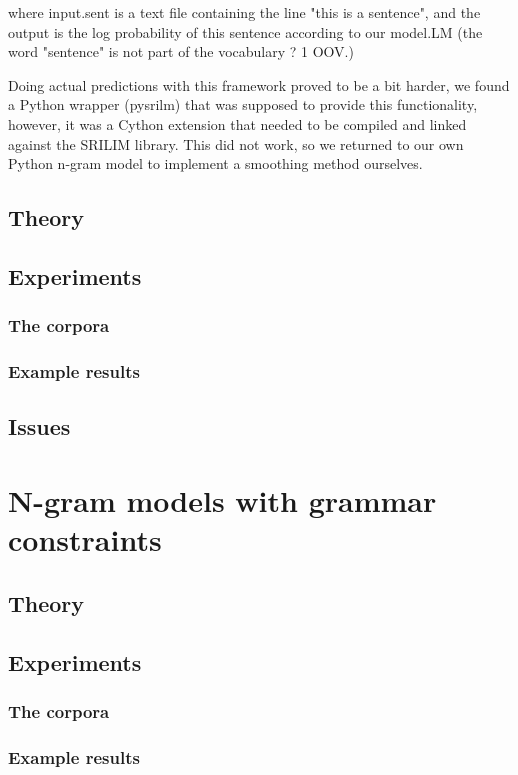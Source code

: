\documentclass[a4paper,12pt]{article}
\begin{document}
where input.sent is a text file containing the line "this is a sentence", and the output is the log probability of this sentence according to our model.LM (the word "sentence" is not part of the vocabulary ? 1 OOV.)

Doing actual predictions with this framework proved to be a bit harder, we found a Python wrapper (pysrilm) that was supposed to provide this functionality, however, it was a Cython extension that needed to be compiled and linked against the SRILIM library. This did not work, so we returned to our own Python n-gram model to implement a smoothing method ourselves.

\label{sec:ngramsmoothing}

\subsection{Theory}
\subsection{Experiments}
\subsubsection{The corpora}
\subsubsection{Example results}
\subsection{Issues}

\section{N-gram models with grammar constraints}
\label{sec:ngramgrammar}

\subsection{Theory}
\subsection{Experiments}
\subsubsection{The corpora}
\subsubsection{Example results}
\end{document}
